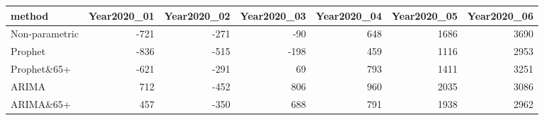 \begin{table}[ht]
\centering
\begin{tabular}{lrrrrrr}
  \hline
method & Year2020\_01 & Year2020\_02 & Year2020\_03 & Year2020\_04 & Year2020\_05 & Year2020\_06 \\ 
  \hline
Non-parametric & -721 & -271 & -90 & 648 & 1686 & 3690 \\ 
  Prophet & -836 & -515 & -198 & 459 & 1116 & 2953 \\ 
  Prophet\&65+ & -621 & -291 & 69 & 793 & 1411 & 3251 \\ 
  ARIMA & 712 & -452 & 806 & 960 & 2035 & 3086 \\ 
  ARIMA\&65+ & 457 & -350 & 688 & 791 & 1938 & 2962 \\ 
   \hline
\end{tabular}
\end{table}
